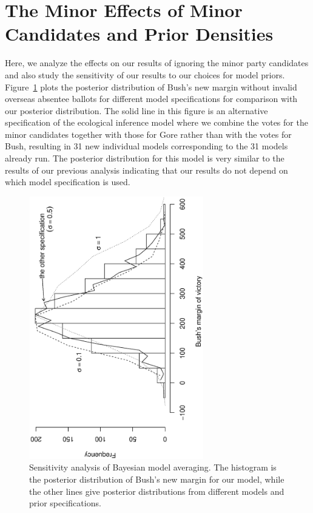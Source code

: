\documentclass[11pt,titlepage]{article}
\begin{document}
\section{The Minor Effects of Minor Candidates and Prior Densities}\label{a:sens}

Here, we analyze the effects on our results of ignoring the minor
party candidates and also study the sensitivity of our results to our
choices for model priors.  Figure~\ref{fg:sensitivity} plots the
posterior distribution of Bush's new margin without invalid overseas
absentee ballots for different model specifications for comparison
with our posterior distribution.  The solid line in this figure is an
alternative specification of the ecological inference model where we
combine the votes for the minor candidates together with those for
Gore rather than with the votes for Bush, resulting in 31 new
individual models corresponding to the 31 models already run.  The
posterior distribution for this model is very similar to the results
of our previous analysis indicating that our results do not depend on
which model specification is used.
\begin{figure}[t]
\begin{center}
\includegraphics[width=3in,height=4.5in,angle=-90]{sensitivity}
\caption{Sensitivity analysis of Bayesian model
  averaging. The histogram is the posterior distribution of Bush's new
  margin for our model, while the other lines give posterior
  distributions from different models and prior specifications.}
\label{fg:sensitivity}
\end{center} 
\end{figure}
\end{document}
